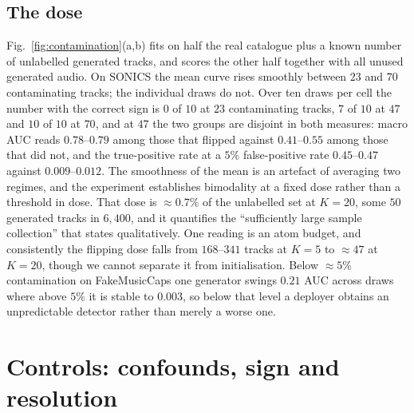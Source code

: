 \documentclass{article}
\begin{document}
\subsection{The dose}
\label{ssec:dose}
Fig.~\ref{fig:contamination}(a,b) fits on half the real catalogue plus a known
number of unlabelled generated tracks, and scores the other half together with all
unused generated audio. On SONICS the mean curve rises smoothly between $23$ and $70$
contaminating tracks; the individual draws do not. Over ten draws per cell the number
with the correct sign is $0$ of $10$ at $23$ contaminating tracks, $7$ of $10$ at
$47$ and $10$ of $10$ at $70$, and at $47$ the two groups are disjoint in both
measures: macro AUC reads $0.78$--$0.79$ among those that flipped against
$0.41$--$0.55$ among those that did not, and the true-positive rate at a $5\%$
false-positive rate $0.45$--$0.47$ against $0.009$--$0.012$. The smoothness of the
mean is an artefact of averaging two regimes, and the experiment establishes
bimodality at a fixed dose rather than a threshold in dose. That dose is
${\approx}0.7\%$ of the unlabelled set at $K{=}20$, some $50$ generated tracks in
$6{,}400$, and it quantifies the ``sufficiently large sample collection'' that
\cite{afchar2026finding} states qualitatively. One reading is an atom
budget, and consistently the flipping dose falls from $168$--$341$ tracks at $K{=}5$
to ${\approx}47$ at $K{=}20$, though we cannot separate it from initialisation. Below ${\approx}5\%$ contamination on FakeMusicCaps one generator swings $0.21$
AUC across draws where above $5\%$ it is stable to $0.003$, so below that level a
deployer obtains an unpredictable detector rather than merely a worse one.

\section{Controls: confounds, sign and resolution}
\label{sec:confounds}
\end{document}

